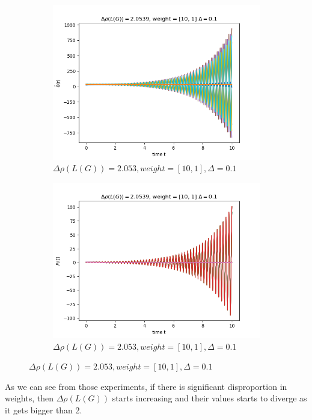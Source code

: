 \documentclass{article}
\begin{document}
\begin{problem}
\begin{figure}[!h]
\begin{subfigure}{0.4\textwidth}
            \includegraphics[width=\textwidth]{./img/Figure_18.png}
            \caption{$\Delta \rho (L(G)) = 2.053, weight = [10,1], \Delta = 0.1$ }
        \end{subfigure}
        \begin{subfigure}{0.4\textwidth}
            \includegraphics[width=\textwidth]{./img/Figure_19.png}
            \caption{$\Delta \rho (L(G)) = 2.053, weight = [10,1], \Delta = 0.1$ }
        \end{subfigure}
    \end{figure}
    \newpage
    As we can see from those experiments, if there is significant disproportion in weights, then $\Delta \rho (L(G))$ starts increasing and their values starts to diverge as it gets bigger than 2. 
\end{problem}
\end{document}
